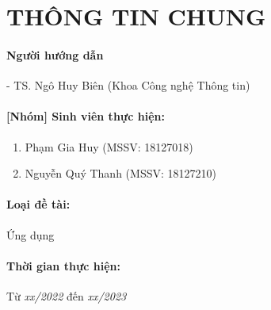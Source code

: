 \newpage

\section{THÔNG TIN CHUNG}

\paragraph{Người hướng dẫn}
\tab - TS. Ngô Huy Biên (Khoa Công nghệ Thông tin)    

\paragraph{[Nhóm] Sinh viên thực hiện:}
\begin{enumerate}
    \item Phạm Gia Huy (MSSV: 18127018)
    \item Nguyễn Quý Thanh (MSSV: 18127210)
\end{enumerate}

\paragraph{Loại đề tài:}
Ứng dụng

\paragraph{Thời gian thực hiện:}
Từ \textsl{xx/2022} đến \textsl{xx/2023}
